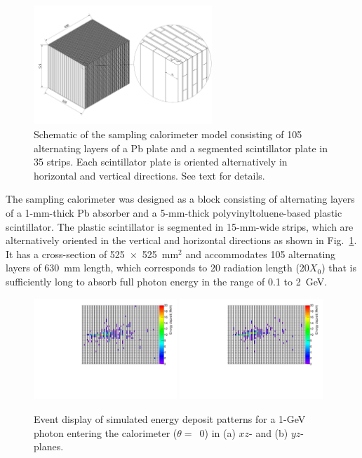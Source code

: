 \documentclass[preprint,12pt,times,a4paper]{elsarticle}
\begin{document}
\begin{figure}[!hbt]
\centering
\includegraphics[width=0.6\textwidth]{figures/Fig1_detector_schematic.jpeg}
\caption{ Schematic of the sampling calorimeter model consisting of 105 alternating layers of a Pb plate and a segmented scintillator plate in 35 strips. Each scintillator plate is oriented alternatively in horizontal and vertical directions. See text for details. }
\label{fig:det_conf}
\end{figure}


The sampling calorimeter was designed as a block consisting of alternating layers of a 1-mm-thick Pb absorber and a 5-mm-thick polyvinyltoluene-based plastic scintillator. The plastic scintillator is segmented in 15-mm-wide strips, which are alternatively oriented in the vertical and horizontal directions as shown in Fig.~\ref{fig:det_conf}. It has a cross-section of 525~$\times$~525~mm$^{2}$ and accommodates 105 alternating layers of 630~mm length, which corresponds to 20 radiation length (20$X_{0}$) that is sufficiently long to absorb full photon energy in the range of 0.1 to 2~GeV.

\begin{figure}[!hbt]
\centering
\includegraphics[width=0.48\textwidth]{figures/Fig2_EMShower_XZ.pdf}
\includegraphics[width=0.48\textwidth]{figures/Fig2_EMShower_YZ.pdf}
\caption{ Event display of simulated energy deposit patterns for a 1-GeV photon entering the calorimeter ($\theta=$~0) in (a) $xz$- and (b) $yz$-planes.}
\label{fig:Evt_Dis}
\end{figure}
\end{document}
